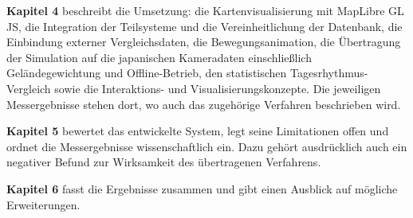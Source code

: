 \documentclass[12pt,a4paper]{scrreprt}
\begin{document}
\textbf{Kapitel 4} beschreibt die Umsetzung: die Kartenvisualisierung
mit MapLibre GL JS, die Integration der Teilsysteme und die
Vereinheitlichung der Datenbank, die Einbindung externer
Vergleichsdaten, die Bewegungsanimation, die Übertragung der Simulation
auf die japanischen Kameradaten einschließlich Geländegewichtung und
Offline-Betrieb, den statistischen Tagesrhythmus-Vergleich sowie die
Interaktions- und Visualisierungskonzepte. Die jeweiligen
Messergebnisse stehen dort, wo auch das zugehörige Verfahren
beschrieben wird.

\textbf{Kapitel 5} bewertet das entwickelte System, legt seine
Limitationen offen und ordnet die Messergebnisse wissenschaftlich ein.
Dazu gehört ausdrücklich auch ein negativer Befund zur Wirksamkeit des
übertragenen Verfahrens.

\textbf{Kapitel 6} fasst die Ergebnisse zusammen und gibt einen Ausblick
auf mögliche Erweiterungen.

%
%
%
%
%
\end{document}
